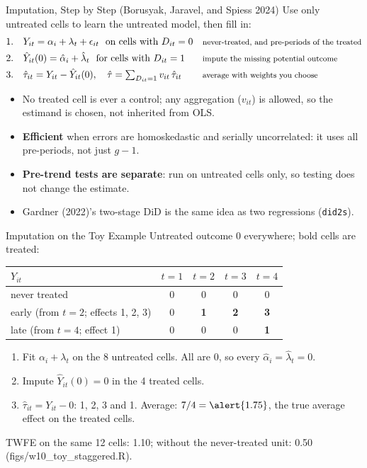 \documentclass[aspectratio=169,11pt,xcolor=dvipsnames]{beamer}
\newcommand{\srcp}[1]{{\scriptsize\color{gray}(#1)}}
\newcommand{\srct}[1]{#1}
\begin{document}
\begin{frame}{Imputation, Step by Step \srcp{Borusyak, Jaravel, and Spiess 2024}}
Use only untreated cells to learn the untreated model, then fill in:
\begin{align*}
  \text{1.}&\quad Y_{it} = \alpha_i + \lambda_t + \epsilon_{it}\ \text{ on cells with } D_{it} = 0
   && \text{\footnotesize never-treated, and pre-periods of the treated} \\
  \text{2.}&\quad \hat Y_{it}(0) = \hat\alpha_i + \hat\lambda_t\ \text{ for cells with } D_{it} = 1
   && \text{\footnotesize impute the missing potential outcome} \\
  \text{3.}&\quad \hat\tau_{it} = Y_{it} - \hat Y_{it}(0),\quad
   \hat\tau = \textstyle\sum_{D_{it}=1} v_{it}\,\hat\tau_{it}
   && \text{\footnotesize average with weights you choose}
\end{align*}
\begin{itemize}\itemsep2pt
  \item No treated cell is ever a control; any aggregation ($v_{it}$) is
        allowed, so the estimand is chosen, not inherited from OLS.
  \item \textbf{Efficient} when errors are homoskedastic and serially
        uncorrelated: it uses all pre-periods, not just $g-1$.
  \item \textbf{Pre-trend tests are separate}: run on untreated cells only, so
        testing does not change the estimate.
  \item \srct{Gardner (2022)}'s two-stage DiD is the same idea as two regressions
        (\texttt{did2s}).
\end{itemize}
\end{frame}

\begin{frame}{Imputation on the Toy Example}
Untreated outcome 0 everywhere; bold cells are treated:
\begin{center}\small
\renewcommand{\arraystretch}{1.2}
\begin{tabular}{@{}lcccc@{}}
\toprule
$Y_{it}$ & $t=1$ & $t=2$ & $t=3$ & $t=4$ \\
\midrule
never treated & 0 & 0 & 0 & 0 \\
early (from $t = 2$; effects 1, 2, 3) & 0 & \textbf{1} & \textbf{2} & \textbf{3} \\
late (from $t = 4$; effect 1) & 0 & 0 & 0 & \textbf{1} \\
\bottomrule
\end{tabular}
\end{center}
\begin{enumerate}\itemsep3pt
  \item Fit $\alpha_i + \lambda_t$ on the 8 untreated cells. All are 0, so every
        $\hat\alpha_i = \hat\lambda_t = 0$.
  \item Impute $\hat Y_{it}(0) = 0$ in the 4 treated cells.
  \item $\hat\tau_{it} = Y_{it} - 0$: 1, 2, 3 and 1. Average: $7/4 = \alert{1.75}$, the true
        average effect on the treated cells.
\end{enumerate}
\vskip2pt
TWFE on the same 12 cells: 1.10; without the never-treated unit: 0.50
\srcp{figs/w10\_toy\_staggered.R}.
\end{frame}
\end{document}
